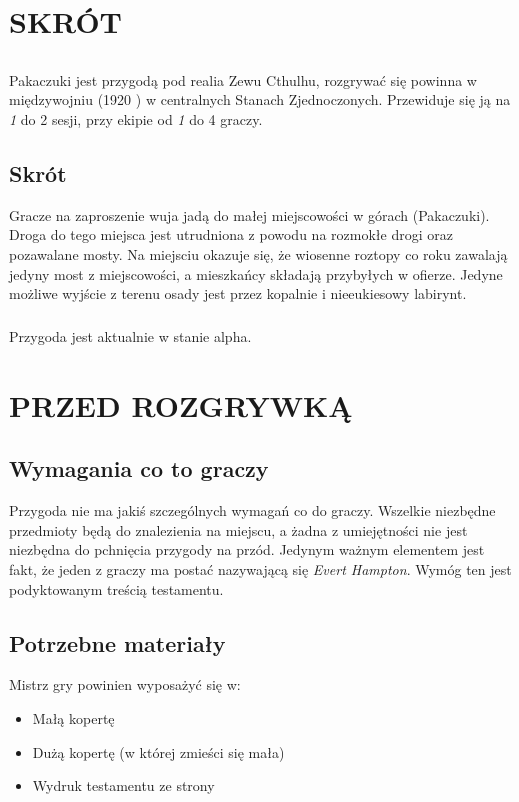 \documentclass[ms,a4paper]{memoir}
\newcommand{\red}[1]{\textcolor{red!50!black}{#1}}
\newcommand{\RED}[1]{\textcolor{red!50!black}{\MakeUppercase{#1}}}
\begin{document}
\chapter{\RED{Skrót}}
\section{}
\paragraph{}
Pakaczuki jest przygodą pod realia Zewu Cthulhu, rozgrywać się powinna w międzywojniu (1920 )
w centralnych Stanach Zjednoczonych. Przewiduje się ją na \emph{1} do 2 sesji, przy ekipie od \emph{1} do 4 graczy.\\
\section{Skrót}
Gracze na zaproszenie wuja jadą do małej miejscowości w górach (Pakaczuki).
Droga do tego miejsca jest utrudniona z powodu na rozmokłe drogi oraz pozawalane mosty.
Na miejsciu okazuje się, że wiosenne roztopy co roku zawalają jedyny most z miejscowości, a mieszkańcy składają przybyłych w ofierze.
Jedyne możliwe wyjście z terenu osady jest przez kopalnie i nieeukiesowy labirynt.
\paragraph{}
Przygoda jest aktualnie w stanie \red{alpha}.
\newpage
\tableofcontents
\newpage

\chapter{\RED{Przed rozgrywką}}

\section{Wymagania co to graczy}
Przygoda nie ma jakiś szczególnych wymagań co do graczy.
Wszelkie niezbędne przedmioty będą do znalezienia na miejscu,
a żadna z umiejętności nie jest niezbędna do pchnięcia przygody
na przód. Jedynym ważnym elementem jest fakt, że jeden z graczy
ma postać nazywającą się \emph{Evert Hampton}. Wymóg ten jest
podyktowanym treścią testamentu.
\section{Potrzebne materiały}
Mistrz gry powinien wyposażyć się w:
\begin{itemize}
\item Małą kopertę
\item Dużą kopertę (w której zmieści się mała)
\item Wydruk testamentu ze strony %
\end{itemize}
\end{document}
